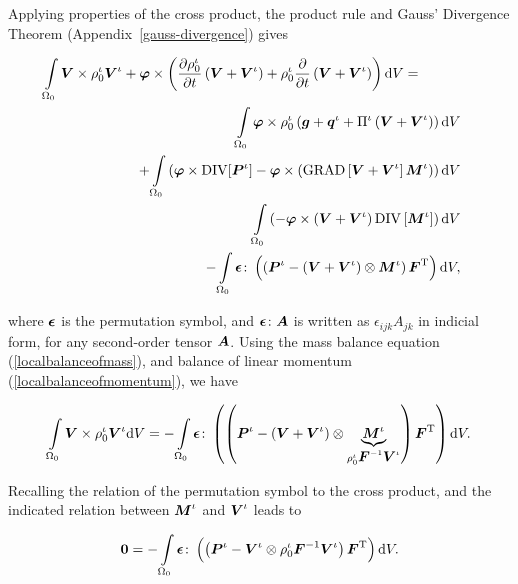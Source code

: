 \noindent Applying properties of the cross product, the product rule
and Gauss' Divergence Theorem (Appendix~\ref{gauss-divergence}) gives

\begin{eqnarray}
\int\limits_{\Omega_0}\mbox{\boldmath$ V$}\times\rho^\iota_0\mbox{\boldmath$ V$}^\iota + \mbox{\boldmath$\varphi$}\times
\left(\frac{\partial\rho^\iota_0}{\partial
  t}\left(\mbox{\boldmath$ V$}+\mbox{\boldmath$ V$}^\iota\right)+ \rho^\iota_0\frac{\partial} {\partial
  t}\left(\mbox{\boldmath$ V$}+\mbox{\boldmath$ V$}^\iota\right)\right)\mathrm{d}V =\qquad\quad&
&\nonumber\\ \int\limits_{\Omega_0}\mbox{\boldmath$\varphi$}\times\rho^\iota_0
\left(\mbox{\boldmath$ g$}+\mbox{\boldmath$ q$}^\iota+\Pi^\iota\left(\mbox{\boldmath$ V$}+\mbox{\boldmath$ V$}^\iota\right)\right)
\mathrm{d}V& &\nonumber\\ +
\int\limits_{\Omega_0}\left(\mbox{\boldmath$\varphi$}\times\mathrm{DIV}[\mbox{\boldmath$ P$}^\iota] -
\mbox{\boldmath$\varphi$}\times\left(\mathrm{GRAD}
\left[\mbox{\boldmath$ V$}+\mbox{\boldmath$ V$}^\iota\right]\mbox{\boldmath$ M$}^\iota\right)\right)\mathrm{d}V &
&\nonumber\\ \int\limits_{\Omega_0}
\left(-\mbox{\boldmath$\varphi$}\times\left(\mbox{\boldmath$ V$}+\mbox{\boldmath$ V$}^\iota\right)
\mathrm{DIV}\left[\mbox{\boldmath$ M$}^\iota\right]\right) \mathrm{d}V & &\nonumber\\ -
\int\limits_{\Omega_0}\mbox{\boldmath$\epsilon$}\colon\left(\left(\mbox{\boldmath$ P$}^\iota -
\left(\mbox{\boldmath$ V$}+\mbox{\boldmath$ V$}^\iota\right) \otimes\mbox{\boldmath$ M$}^\iota\right)
\mbox{\boldmath$ F$}^\mathrm{T}\right) \mathrm{d}V,\nonumber
\end{eqnarray}

\noindent where $\mbox{\boldmath$\epsilon$}$ is the permutation symbol, and
$\mbox{\boldmath$\epsilon$}\colon\mbox{\boldmath$ A$}$ is written as $\epsilon_{ijk}A_{jk}$ in indicial
form, for any second-order tensor $\mbox{\boldmath$ A$}$. Using the mass balance
equation (\ref{localbalanceofmass}), and balance of linear momentum
(\ref{localbalanceofmomentum}), we have

\begin{displaymath}
\int\limits_{\Omega_0}\mbox{\boldmath$ V$}\times\rho^\iota_0\mbox{\boldmath$ V$}^\iota\mathrm{d}V =
-\int\limits_{\Omega_0}\mbox{\boldmath$\epsilon$}\colon
\left(\left(\mbox{\boldmath$ P$}^\iota-\left(\mbox{\boldmath$ V$}+\mbox{\boldmath$ V$}^\iota\right)
\otimes\underbrace{\mbox{\boldmath$ M$}^\iota}_{\rho_0^\iota\mbox{\boldmath$ F$}^{-1}\mbox{\boldmath$ V$}^\iota}\right)
\mbox{\boldmath$ F$}^\mathrm{T}\right)\mathrm{d}V.
\end{displaymath}

\noindent Recalling the relation of the permutation symbol to the
cross product, and the indicated relation between $\mbox{\boldmath$ M$}^\iota$ and
$\mbox{\boldmath$ V$}^\iota$ leads to

\begin{equation}
{\bf 0} =
-\int\limits_{\Omega_0}\mbox{\boldmath$\epsilon$}\colon\left(\left(\mbox{\boldmath$ P$}^\iota-\mbox{\boldmath$ V$}^\iota
\otimes \rho_0^\iota\mbox{\boldmath$ F$}^{-1}\mbox{\boldmath$ V$}^\iota\right)
\mbox{\boldmath$ F$}^\mathrm{T}\right)\mathrm{d}V.\nonumber
\end{equation}

